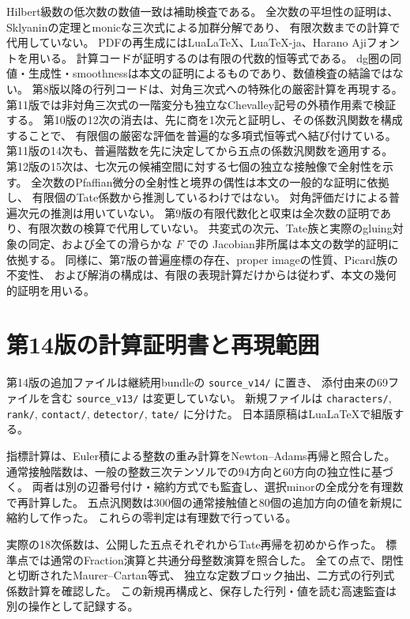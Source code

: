 \documentclass[a4paper,11pt]{ltjsarticle}
\theoremstyle{definition}
\begin{document}
Hilbert級数の低次数の数値一致は補助検査である。
全次数の平坦性の証明は、Sklyaninの定理とmonicな三次式による加群分解であり、
有限次数までの計算で代用していない。
PDFの再生成にはLuaLaTeX、LuaTeX-ja、Harano Ajiフォントを用いる。
計算コードが証明するのは有限の代数的恒等式である。
dg圏の同値・生成性・smoothnessは本文の証明によるものであり、数値検査の結論ではない。
第8版以降の行列コードは、対角三次式への特殊化の厳密計算を再現する。
第11版では非対角三次式の一階変分も独立なChevalley記号の外積作用素で検証する。
第10版の12次の消去は、先に商を1次元と証明し、その係数汎関数を構成することで、
有限個の厳密な評価を普遍的な多項式恒等式へ結び付けている。
第11版の14次も、普遍階数を先に決定してから五点の係数汎関数を適用する。
第12版の15次は、七次元の候補空間に対する七個の独立な接触像で全射性を示す。
全次数のPfaffian微分の全射性と境界の偶性は本文の一般的な証明に依拠し、
有限個のTate係数から推測しているわけではない。
対角評価だけによる普遍次元の推測は用いていない。
第9版の有限代数化と収束は全次数の証明であり、有限次数の検算で代用していない。
共変式の次元、Tate族と実際のgluing対象の同定、および全ての滑らかな $F$ での
Jacobian非所属は本文の数学的証明に依拠する。
同様に、第7版の普遍座標の存在、proper imageの性質、Picard族の不変性、
および解消の構成は、有限の表現計算だけからは従わず、本文の幾何的証明を用いる。

\clearpage
\section{第14版の計算証明書と再現範囲}
\label{app:v14-reproducibility}

第14版の追加ファイルは継続用bundleの \texttt{source\_v14/} に置き、
添付由来の69ファイルを含む \texttt{source\_v13/} は変更していない。
新規ファイルは \texttt{characters/}, \texttt{rank/}, \texttt{contact/},
\texttt{detector/}, \texttt{tate/} に分けた。
日本語原稿はLuaLaTeXで組版する。

指標計算は、Euler積による整数の重み計算をNewton--Adams再帰と照合した。
通常接触階数は、一般の整数三次テンソルでの94方向と60方向の独立性に基づく。
両者は別の辺番号付け・縮約方式でも監査し、選択minorの全成分を有理数で再計算した。
五点汎関数は300個の通常接触値と80個の追加方向の値を新規に縮約して作った。
これらの零判定は有理数で行っている。

実際の18次係数は、公開した五点それぞれからTate再帰を初めから作った。
標準点では通常のFraction演算と共通分母整数演算を照合した。
全ての点で、閉性と切断されたMaurer--Cartan等式、
独立な定数ブロック抽出、二方式の行列式係数計算を確認した。
この新規再構成と、保存した行列・値を読む高速監査は別の操作として記録する。
\end{document}
